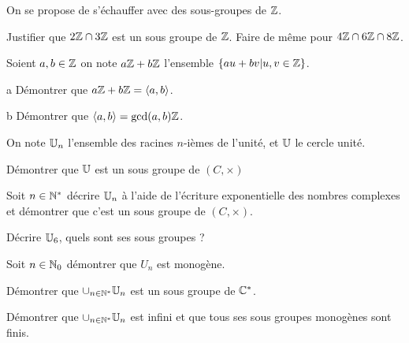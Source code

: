 \documentclass{report}
\begin{document}
\begin{exo} On se propose de s'échauffer avec des sous-groupes de \(\mathbb{Z}\).
    \begin{q}{1}
        Justifier que \(2\mathbb{Z}\cap3\mathbb{Z}\) est un sous groupe de \(\mathbb{Z}\). Faire de même
        pour \(4\mathbb{Z}\cap6\mathbb{Z}\cap8\mathbb{Z}\).
    \end{q}
    \begin{q}{2}
        Soient \(a,b\in\mathbb{Z}\) on note \(a\mathbb{Z}+b\mathbb{Z}\) l'ensemble \(\left\{ au+bv
        | u,v\in\mathbb{Z} \right\}\).
        \begin{q}{a}
            Démontrer que \(a\mathbb{Z}+b\mathbb{Z}=\langle a,b\rangle\).
        \end{q}
        \begin{q}{b}
            Démontrer que \(\langle a,b\rangle=\gcd(a,b)\mathbb{Z}\).
        \end{q}
    \end{q}
\end{exo}

\begin{exo}
    On note \(\mathbb{U}_n\) l'ensemble des racines \(n\)-ièmes de l'unité, et \(\mathbb{U}\) le cercle unité.
    \begin{q}{1}
        Démontrer que \(\mathbb{U}\) est un sous groupe de \(\left(C,\times\right)\)
    \end{q}
    \begin{q}{2}
        Soit \(n\in\mathbb{N}^*\) décrire \(\mathbb{U}_n\) à l'aide de l'écriture exponentielle
        des nombres complexes et démontrer que c'est un sous groupe de
        \(\left(C,\times\right)\).
    \end{q}
    \begin{q}{3}
        Décrire \(\mathbb{U}_6\), quels sont ses sous groupes ?
    \end{q}
    \begin{q}{4}
        Soit \(n\in\mathbb{N}_0\) démontrer que \(U_n\) est monogène.
    \end{q}
    \begin{q}{5}
        Démontrer que \(\cup_{n\in\mathbb{N}^*}\mathbb{U}_n\) est un sous groupe de \(\mathbb{C}^*\).
    \end{q}
    \begin{q}{6}
        Démontrer que \(\cup_{n\in\mathbb{N}^*}\mathbb{U}_n\) est infini et que tous ses sous groupes
        monogènes sont finis.
    \end{q}
\end{exo}
\end{document}
